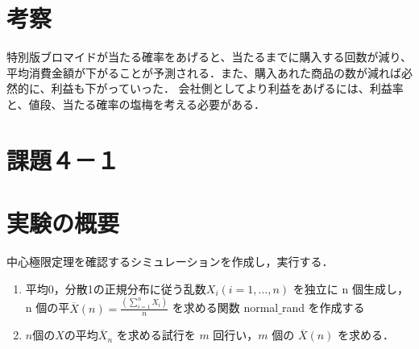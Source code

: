 \documentclass[fleqn, a4paper. 12pt]{ltjsarticle} %
\begin{document}
\section*{考察}
特別版ブロマイドが当たる確率をあげると、当たるまでに購入する回数が減り、平均消費金額が下がることが予測される．また、購入あれた商品の数が減れば必然的に、利益も下がっていった．
会社側としてより利益をあげるには、利益率と、値段、当たる確率の塩梅を考える必要がある．
\newpage
\section*{課題４－１}
\section*{実験の概要}
中心極限定理を確認するシミュレーションを作成し，実行する．
\begin{enumerate}
  \item 平均0，分散1の正規分布に従う乱数$X_i (i = 1, . . . , n)$ を独立に n 個生成し，n 個の平$\overline{X}(n) = \frac{(\sum_{i=1}^{n} X_i)}{n}$ を求める関数 normal$\_$rand を作成する
  \item  $n$個の$X$の平均$\overline{X}_n$ を求める試行を $m$ 回行い，$m$ 個の $\overline{X}(n)$ を求める．
\end{enumerate}
\end{document}
